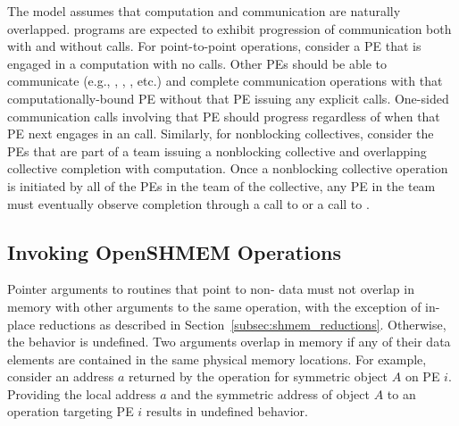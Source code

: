 The \openshmem model assumes that computation and communication are naturally
overlapped. \openshmem programs are expected to exhibit progression of
communication both with and without \openshmem calls. For point-to-point
operations, consider a \ac{PE} that is
engaged in a computation with no \openshmem calls. Other \acp{PE} should be able
to communicate (e.g., , , , etc.) and
complete communication operations with that computationally-bound \ac{PE}
without that \ac{PE} issuing any explicit \openshmem calls. One-sided \openshmem
communication calls involving that \ac{PE} should progress regardless of when
that \ac{PE} next engages in an \openshmem call. Similarly,
for nonblocking collectives, consider the \acp{PE} that are part of a team
issuing a nonblocking collective and overlapping collective completion with
computation. Once a nonblocking collective operation is initiated by
all of the \acp{PE} in the team of the collective, any \ac{PE} in the team must
eventually observe completion through a call to  or a
call to .


\subsection{Invoking OpenSHMEM Operations}\label{subsec:invoking_openshmem_operations}

Pointer arguments to \openshmem routines that point to non- data must not
overlap in memory with other arguments to the same \openshmem operation, with
the exception of in-place reductions as described in Section~\ref{subsec:shmem_reductions}.
Otherwise, the behavior is undefined.  Two arguments overlap in memory if any
of their data elements are contained in the same physical memory locations.
For example, consider an address $a$ returned by the  operation
for symmetric object $A$ on \ac{PE} $i$.  Providing the local address $a$ and
the symmetric address of object $A$ to an \openshmem operation targeting
\ac{PE} $i$ results in undefined behavior.

